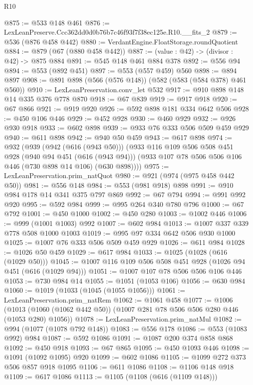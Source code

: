\begin{lexlean}{R10}
\begin{coremodule}
@875 := @533 @148 @461
@876 := LexLeanPreserve.Ccc362dd0d0b76b7c46f93f7f38ec125e.R10.__fits_2
@879 := @536 (@876 @458 @442)
@880 := VerdantEngine.FloatStorage.roundQuotient
@884 := @879 (@67 (@880 @458 @442))
@887 := (value : @42) -> (divisor : @42) -> @875 @884
@891 := @545 @148 @461 @884 @378
@892 := @556 @94
@894 := @553 (@892 @451)
@897 := @553 (@557 @459) @560
@898 := @894 @897
@908 := @891 @898 (@566 (@576 @148)) (@582 (@583 (@584 @378) @461 @560))
@910 := LexLeanPreservation.conv_let @532
@917 := @910 @898 @148 @14 @335 @376 @778 @870
@918 := @67 @839
@919 := @917 @918
@920 := @67 @866
@921 := @919 @920
@926 := @592 @898 @181 @334 @642 @506
@928 := @450 @106 @446
@929 := @452 @928
@930 := @460 @929
@932 := @926 @930 @918
@933 := @602 @898
@939 := @933 @76 @333 @506 @509 @459 @929
@940 := @611 @898
@942 := @940 @50 @459
@943 := @617 @898
@974 := @932
    (@939
      (@942 (@616 (@943 @50)))
      (@933
        @116
        @109
        @506
        @508
        @451
        @928
        (@940 @94 @451 (@616 (@943 @94)))
        (@933 @107 @78 @506 @506 @106 @446 (@730 @898 @14 @106) (@630 @898))))
@975 := LexLeanPreservation.prim_natQuot
@980 := @921 (@974 (@975 @458 @442 @50))
@981 := @556 @148
@984 := @553 (@981 @918) @898
@991 := @910 @984 @178 @14 @341 @375 @797 @869
@992 := @67 @794
@994 := @991 @992 @920
@995 := @592 @984
@999 := @995 @264 @340 @780 @796
@1000 := @67 @792
@1001 := @450 @1000
@1002 := @450 @280
@1003 := @1002 @446
@1006 := @999 (@1001 @1003) @992
@1007 := @602 @984
@1013 := @1007 @337 @339 @778 @508 @1000 @1003
@1019 := @995 @97 @334 @642 @506 @930 @1000
@1025 := @1007 @76 @333 @506 @509 @459 @929
@1026 := @611 @984
@1028 := @1026 @50 @459
@1029 := @617 @984
@1033 := @1025 (@1028 (@616 (@1029 @50)))
@1045 := @1007 @116 @109 @506 @508 @451 @928 (@1026 @94 @451 (@616 (@1029 @94)))
@1051 := @1007 @107 @78 @506 @506 @106 @446
@1053 := @730 @984 @14
@1055 := @1051 (@1053 @106)
@1056 := @630 @984
@1060 := @1019 (@1033 (@1045 (@1055 @1056)))
@1061 := LexLeanPreservation.prim_natRem
@1062 := @1061 @458
@1077 := @1006
    (@1013 (@1060 (@1062 @442 @50)) (@1007 @281 @78 @506 @506 @280 @446 (@1053 @280) @1056))
@1078 := LexLeanPreservation.prim_natMul
@1082 := @994 (@1077 (@1078 @792 @148))
@1083 := @556 @178
@1086 := @553 (@1083 @992) @984
@1087 := @592 @1086
@1091 := @1087 @200 @374 @858 @868
@1092 := @450 @918
@1093 := @67 @865
@1095 := @450 @1093 @446
@1098 := @1091 (@1092 @1095) @920
@1099 := @602 @1086
@1105 := @1099 @272 @373 @506 @857 @918 @1095
@1106 := @611 @1086
@1108 := @1106 @148 @918
@1109 := @617 @1086
@1113 := @1105 (@1108 (@616 (@1109 @148)))

\end{coremodule}
\end{lexlean}
